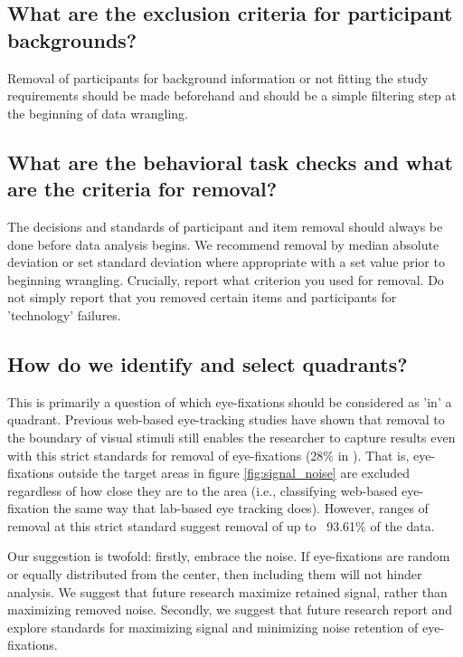 \subsection{What are the exclusion criteria for participant backgrounds?}

Removal of participants for background information or not fitting the study requirements should be made beforehand and should be a simple filtering step at the beginning of data wrangling.

\subsection{What are the behavioral task checks and what are the criteria for removal?}

The decisions and standards of participant and item removal should always be done before data analysis begins. We recommend removal by median absolute deviation or set standard deviation where appropriate with a set value prior to beginning wrangling.  
Crucially, report what criterion you used for removal. Do not simply report that you removed certain items and participants for 'technology' failures.

\subsection{How do we identify and select quadrants?}
This is primarily a question of which eye-fixations should be considered as 'in' a quadrant. Previous web-based eye-tracking studies have shown that removal to the boundary of visual stimuli still enables the researcher to capture results even with this strict standards for removal of eye-fixations (28\% in \textcite{Vos_2017}). That is, eye-fixations outside the target areas in figure \ref{fig:signal_noise} are excluded regardless of how close they are to the area (i.e., classifying web-based eye-fixation the same way that lab-based eye tracking does). However, ranges of removal at this strict standard suggest removal of up to ~93.61\% of the data. 

Our suggestion is twofold: firstly, embrace the noise. If eye-fixations are random or equally distributed from the center, then including them will not hinder analysis. We suggest that future research maximize retained signal, rather than maximizing removed noise.  Secondly, we suggest that future research report and explore standards for maximizing signal and minimizing noise retention of eye-fixations. 


